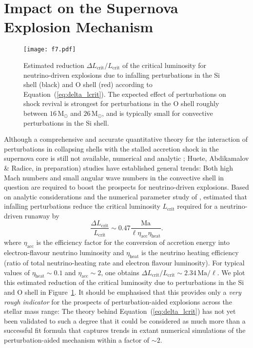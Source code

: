 \documentclass[useAMS,usenatbib]{mnras}
\newcommand{\Msun}{\ensuremath{\mathrm{M}_\odot}}
\begin{document}
\section{Impact on the Supernova Explosion Mechanism}
\label{sec:impact}

\begin{figure}
\texttt{[image: f7.pdf]}
\caption{Estimated reduction
$\Delta L_\mathrm{crit}/L_\mathrm{crit}$ of the critical luminosity for neutrino-driven explosions due to infalling perturbations in the Si shell (black) and O shell (red) according to Equation~(\ref{eq:delta_lcrit}).  The expected effect of perturbations on shock revival is strongest for perturbations in the O shell roughly between $16 \,\Msun$ and $26 \,\Msun$, and is typically small for convective perturbations in the Si shell. 
\label{fig:ma_over_l}}
\end{figure}

Although a comprehensive and accurate quantitative theory for the
interaction of perturbations in collapsing shells with the stalled
accretion shock in the supernova core is still not available,
numerical \citep{mueller_15a} and analytic
\citealp{abdikamalov_16,mueller_16c}; Huete, Abdikamalov \& Radice, in preparation) studies have established general
trends: Both high Mach numbers and small angular wave numbers in the
convective shell in question are required to boost the prospects for
neutrino-driven explosions. Based on analytic
considerations and the numerical parameter study
of \citet{mueller_15a}, \citet{mueller_16c} estimated
that infalling perturbations reduce
the critical luminosity $L_\mathrm{crit}$
\citep{burrows_93} required for a neutrino-driven
runaway by
\begin{equation}
\label{eq:delta_lcrit}
\frac{\Delta L_\mathrm{crit}}{L_\mathrm{crit}}\sim 
0.47 \frac{\mathrm{Ma}}{\ell \eta_\mathrm{acc} \eta_\mathrm{heat}}.
\end{equation}
where $\eta_\mathrm{acc}$ is the efficiency factor for the conversion
of accretion energy into electron-flavour neutrino luminosity and
$\eta_\mathrm{heat}$ is the neutrino heating efficiency (ratio of total
neutrino-heating rate and electron flavour luminosity).  For typical
values of $\eta_\mathrm{heat}\sim 0.1$ and $\eta_\mathrm{acc}\sim 2$,
one obtains $\Delta L_\mathrm{crit}/L_\mathrm{crit} \sim 2.34\,\mathrm{Ma}/\ell$.  We plot this estimated reduction of the
critical luminosity due to perturbations in the Si and O shell in
Figure~\ref{fig:ma_over_l}. It should be emphasised that this
provides only a \emph{very rough indicator} for the prospects of
perturbation-aided explosions across the stellar mass range: The
theory behind Equation~(\ref{eq:delta_lcrit}) has not yet been
validated to such a degree that it could be considered as much
more than a successful fit formula \citep{mueller_17} that
captures trends in extant numerical simulations of the
perturbation-aided mechanism
\citep{couch_13,couch_15,mueller_16c,mueller_17} within a factor
of $\mathord{\sim} 2$.
\end{document}
